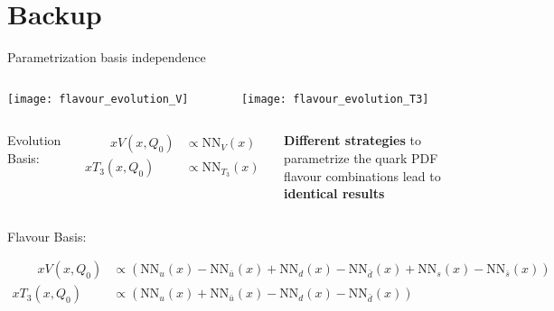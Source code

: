 
\appendix

\section{Backup}

\begin{frame}{Parametrization basis independence}
    \begin{columns}
        \begin{column}[T]{0.48\textwidth}
        \vspace*{0pt}%
	        \begin{center}
	            \texttt{[image: flavour\_evolution\_V]} \\
	        \end{center}
        \end{column}
        \begin{column}[t]{0.48\textwidth}
        \vspace{0pt}%
	        \begin{center}
	            \texttt{[image: flavour\_evolution\_T3]} \\
	        \end{center}
        \end{column}
    \end{columns}
    \begin{columns}
		    Evolution Basis:
		    {\footnotesize
		    \begin{fleqn}
		    \begin{align*}
		       \qquad x V\left(x, Q_{0}\right) &\propto \mathrm{NN}_{V}(x)\\
		        x T_{3}\left(x, Q_{0}\right) &\propto \mathrm{NN}_{T_{3}}(x)
		    \end{align*}
		    \end{fleqn}
		    }
            \begin{block}{}
                \textbf{Different strategies} to parametrize the quark PDF flavour combinations lead to \textbf{identical results}
            \end{block}
    \end{columns}
    \vspace*{-0.5em}
    Flavour Basis:
    {\footnotesize
    \begin{fleqn}
    \begin{align*}
        \qquad x V\left(x, Q_{0}\right) &\propto\left(\mathrm{NN}_{u}(x)-\mathrm{NN}_{\bar{u}}(x)+\mathrm{NN}_{d}(x)-\mathrm{NN}_{\bar{d}}(x)+\mathrm{NN}_{s}(x)-\mathrm{NN}_{\bar{s}}(x)\right) \\
        x T_{3}\left(x, Q_{0}\right) &\propto\left(\mathrm{NN}_{u}(x)+\mathrm{NN}_{\bar{u}}(x)-\mathrm{NN}_{d}(x)-\mathrm{NN}_{\bar{d}}(x)\right)
    \end{align*}
    \end{fleqn}
    }
\end{frame}


